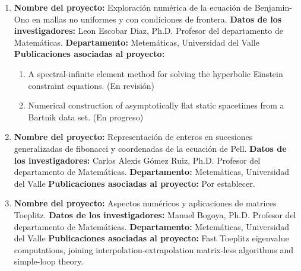 \begin{spacing}{1.5}
\begin{enumerate}
    \item \textbf{Nombre del proyecto:} Exploración numérica de la ecuación
          de Benjamin-Ono en mallas no uniformes y con condiciones de frontera. \newline
          \textbf{Datos de los investigadores:} \newline
          Leon Escobar Diaz, Ph.D. Profesor del departamento de Matemáticas.
          \newline
          \textbf{Departamento: } Metemáticas, Universidad del Valle \newline
          \textbf{Publicaciones asociadas al proyecto: } \begin{enumerate}
            \item A spectral-infinite element method for solving the hyperbolic
                  Einstein constraint equations. (En revisión)
            \item Numerical construction of asymptotically flat static
                  spacetimes from a Bartnik data set. (En progreso)
          \end{enumerate}

    \item \textbf{Nombre del proyecto:} Representación de enteros en
          sucesiones generalizadas de fibonacci y coordenadas de la ecuación de Pell.
          \newline
          \textbf{Datos de los investigadores:} \newline
          Carlos Alexis Gómez Ruiz, Ph.D. Profesor del departamento de
          Matemáticas. \newline
          \textbf{Departamento: } Metemáticas, Universidad del Valle \newline
          \textbf{Publicaciones asociadas al proyecto: } \newline Por establecer.

    \item \textbf{Nombre del proyecto:} Aspectos numéricos y aplicaciones
          de matrices Toeplitz. \newline
          \textbf{Datos de los investigadores:} \newline
          Manuel Bogoya, Ph.D. Profesor del departamento de Matemáticas.
          \textbf{Departamento: } Metemáticas, Universidad del Valle \newline
          \textbf{Publicaciones asociadas al proyecto: } \newline Fast Toeplitz
          eigenvalue computations, joining interpolation-extrapolation matrix-less
          algorithms and simple-loop theory. \cite{Proy4}


\end{enumerate}
\end{spacing}
